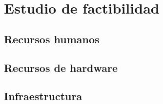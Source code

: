 \chapter[ESTUDIO DE FACTIBILIDAD]{Estudio de factibilidad}

\section[RECURSOS HUMANOS]{Recursos humanos}

\section[RECURSOS DE HARDWARE]{Recursos de hardware}

\section[INFRAESTRUCTURA]{Infraestructura}
